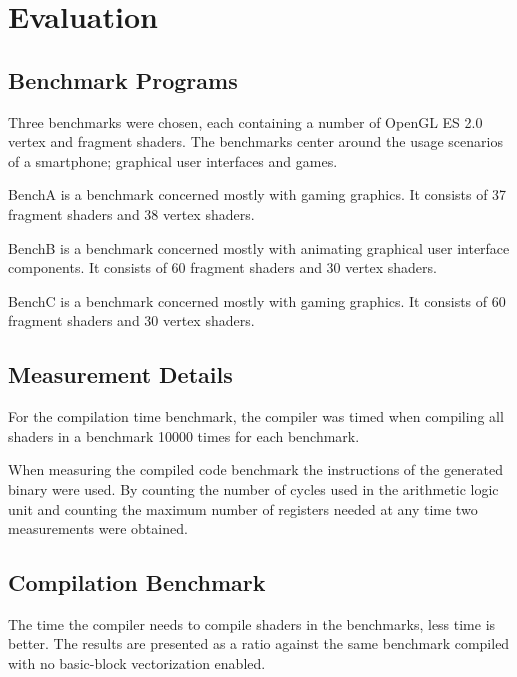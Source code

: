 \documentclass[12pt,a4paper,onecolumn,twoside,openright]{report}
\begin{document}
\chapter{Evaluation}
 \label{chap:evaluation}


\section{Benchmark Programs}
Three benchmarks were chosen, each containing a number of OpenGL ES 2.0 vertex and fragment shaders. The benchmarks center around the usage scenarios of a smartphone; graphical user interfaces and games.

BenchA is a benchmark concerned mostly with gaming graphics. It consists of 37 fragment shaders and 38 vertex shaders.

BenchB is a benchmark concerned mostly with animating graphical user interface components. It consists of 60 fragment shaders and 30 vertex shaders.

BenchC is a benchmark concerned mostly with gaming graphics. It consists of 60 fragment shaders and 30 vertex shaders.


\section{Measurement Details}
For the compilation time benchmark, the compiler was timed when compiling all shaders in a benchmark 10000 times for each benchmark.

When measuring the compiled code benchmark the instructions of the generated binary were used. By counting the number of cycles used in the arithmetic logic unit and counting the maximum number of registers needed at any time two measurements were obtained.


\section{Compilation Benchmark}
The time the compiler needs to compile shaders in the benchmarks, less time is better. The results are presented as a ratio against the same benchmark compiled with no basic-block vectorization enabled.
\end{document}
